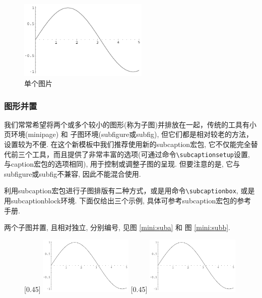 \documentclass[Chinese]{APSart}
\begin{document}
\begin{figure}[htbp]
	\centering
	\includegraphics[width=0.55\textwidth]{figs/sin.pdf}
	\caption{单个图片\label{fig:1}}
\end{figure}


\subsubsection{图形并置 \label{chap5:figure2}}
我们常常希望将两个或多个较小的图形(称为子图)并排放在一起，传统的工具有小页环境(minipage) 和 子图环境(subfigure或subfig), 但它们都是相对较老的方法，设置较为不便. 在这个新模板中我们推荐使用新的subcaption宏包, 它不仅能完全替代前三个工具，而且提供了非常丰富的选项(可通过命令\verb/\subcaptionsetup/设置, 与caption宏包的选项相同), 用于控制或调整子图的呈现. 但要注意的是, 它与subfigure或subfig不兼容, 因此不能混合使用.  

利用subcaption宏包进行子图排版有二种方式，或是用命令\verb/\subcaptionbox/, 或是用subcaptionblock环境. 下面仅给出三个示例,  具体可参考subcaption宏包的参考手册. 

\begin{example}
两个子图并置, 且相对独立, 分别编号, 见图 \ref{mini:suba} 和 图 \ref{mini:subb}. 		
\begin{figure}[htbp] %
	\centering
	[0.45\textwidth]
	{\includegraphics[width=0.4\textwidth]{figs/sin.pdf}}
	[0.45\textwidth]
	{\includegraphics[width=0.4\textwidth]{figs/sin.pdf}}
\end{figure}
\end{example}
\end{document}
